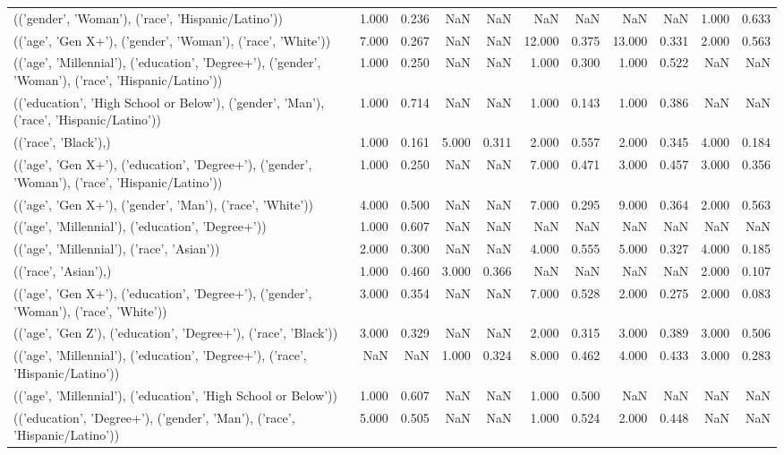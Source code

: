 \begin{tabular}{lrrrrrrrrrr}
(('gender', 'Woman'), ('race', 'Hispanic/Latino')) & 1.000 & 0.236 & NaN & NaN & NaN & NaN & NaN & NaN & 1.000 & 0.633 \\
(('age', 'Gen X+'), ('gender', 'Woman'), ('race', 'White')) & 7.000 & 0.267 & NaN & NaN & 12.000 & 0.375 & 13.000 & 0.331 & 2.000 & 0.563 \\
(('age', 'Millennial'), ('education', 'Degree+'), ('gender', 'Woman'), ('race', 'Hispanic/Latino')) & 1.000 & 0.250 & NaN & NaN & 1.000 & 0.300 & 1.000 & 0.522 & NaN & NaN \\
(('education', 'High School or Below'), ('gender', 'Man'), ('race', 'Hispanic/Latino')) & 1.000 & 0.714 & NaN & NaN & 1.000 & 0.143 & 1.000 & 0.386 & NaN & NaN \\
(('race', 'Black'),) & 1.000 & 0.161 & 5.000 & 0.311 & 2.000 & 0.557 & 2.000 & 0.345 & 4.000 & 0.184 \\
(('age', 'Gen X+'), ('education', 'Degree+'), ('gender', 'Woman'), ('race', 'Hispanic/Latino')) & 1.000 & 0.250 & NaN & NaN & 7.000 & 0.471 & 3.000 & 0.457 & 3.000 & 0.356 \\
(('age', 'Gen X+'), ('gender', 'Man'), ('race', 'White')) & 4.000 & 0.500 & NaN & NaN & 7.000 & 0.295 & 9.000 & 0.364 & 2.000 & 0.563 \\
(('age', 'Millennial'), ('education', 'Degree+')) & 1.000 & 0.607 & NaN & NaN & NaN & NaN & NaN & NaN & NaN & NaN \\
(('age', 'Millennial'), ('race', 'Asian')) & 2.000 & 0.300 & NaN & NaN & 4.000 & 0.555 & 5.000 & 0.327 & 4.000 & 0.185 \\
(('race', 'Asian'),) & 1.000 & 0.460 & 3.000 & 0.366 & NaN & NaN & NaN & NaN & 2.000 & 0.107 \\
(('age', 'Gen X+'), ('education', 'Degree+'), ('gender', 'Woman'), ('race', 'White')) & 3.000 & 0.354 & NaN & NaN & 7.000 & 0.528 & 2.000 & 0.275 & 2.000 & 0.083 \\
(('age', 'Gen Z'), ('education', 'Degree+'), ('race', 'Black')) & 3.000 & 0.329 & NaN & NaN & 2.000 & 0.315 & 3.000 & 0.389 & 3.000 & 0.506 \\
(('age', 'Millennial'), ('education', 'Degree+'), ('race', 'Hispanic/Latino')) & NaN & NaN & 1.000 & 0.324 & 8.000 & 0.462 & 4.000 & 0.433 & 3.000 & 0.283 \\
(('age', 'Millennial'), ('education', 'High School or Below')) & 1.000 & 0.607 & NaN & NaN & 1.000 & 0.500 & NaN & NaN & NaN & NaN \\
(('education', 'Degree+'), ('gender', 'Man'), ('race', 'Hispanic/Latino')) & 5.000 & 0.505 & NaN & NaN & 1.000 & 0.524 & 2.000 & 0.448 & NaN & NaN \\

\end{tabular}
